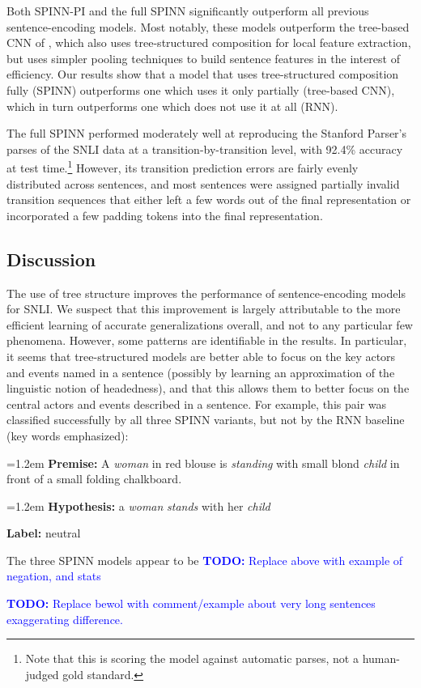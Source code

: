 \documentclass[11pt]{article}
\newcommand\todo[1]{\textcolor{blue}{\textbf{TODO:} #1}}
\newcommand{\snli}[3]{{\vspace{0.25em}
{\small \setlength{\parindent}{0.6em} \hangindent=1.2em  \textbf{Premise:} #1\par}\vspace{0.25em}
{\small \setlength{\parindent}{0.6em} \hangindent=1.2em   \textbf{Hypothesis:} #2\par}\vspace{0.25em}
{\small \setlength{\parindent}{0.6em}  \textbf{Label:} #3\par}
}}
\begin{document}
Both SPINN-PI and the full SPINN significantly outperform all previous sentence-encoding models. Most notably, these models outperform the tree-based CNN of \citet{mou2015recognizing}, which also uses tree-structured composition for local feature extraction, but uses simpler pooling techniques to build sentence features in the interest of efficiency. Our results show that a model that uses tree-structured composition fully (SPINN) outperforms one which uses it only partially (tree-based CNN), which in turn outperforms one which does not use it at all (RNN).

The full SPINN performed moderately well at reproducing the Stanford Parser's parses of the SNLI data at a transition-by-transition level, with 92.4\% accuracy at test time.\footnote
  {Note that this is scoring the model against automatic parses, not a human-judged gold standard.}
However, its transition prediction errors are fairly evenly distributed across sentences, and most sentences were assigned partially invalid transition sequences that either left a few words out of the final representation or incorporated a few padding tokens into the final representation.

\subsection{Discussion}

The use of tree structure improves the performance of sentence-encoding models for SNLI. We suspect that this improvement is largely attributable to the more efficient learning of accurate generalizations overall, and not to any particular few phenomena. However, some patterns are identifiable in the results. In particular, it seems that tree-structured models are better able to focus on the key actors and events named in a sentence (possibly by learning an approximation of the linguistic notion of headedness), and that this allows them to better focus on the central actors and events described in a sentence. For example, this pair was classified successfully by all three SPINN variants, but not by the RNN baseline (key words emphasized):

\snli
{A \textit{woman} in red blouse is \textit{standing} with small blond \textit{child} in front of a small folding chalkboard.}
{a \textit{woman} \textit{stands} with her \textit{child}}
{neutral}
The three SPINN models appear to be 
\todo{Replace above with example of negation, and stats}

\todo{Replace bewol with comment/example about very long sentences exaggerating difference.}
\end{document}
